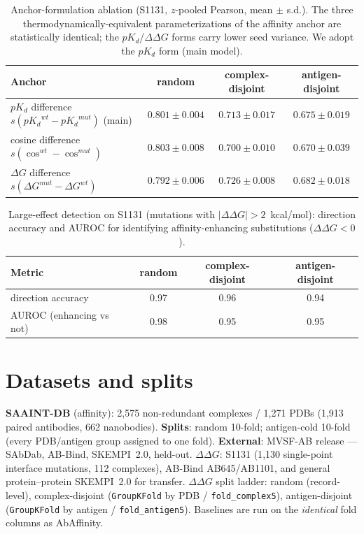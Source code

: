 \documentclass{article}
\newcommand{\ddg}{\ensuremath{\Delta\Delta G}}
\newcommand{\pkd}{\ensuremath{pK_d}}
\begin{document}
\begin{table}[h]\centering
\caption{Anchor-formulation ablation (S1131, $z$-pooled Pearson, mean $\pm$ s.d.). The three
thermodynamically-equivalent parameterizations of the affinity anchor are statistically identical; the
\pkd{}/\ddg{} forms carry lower seed variance. We adopt the \pkd{} form (main model).}
\begin{tabular}{lccc}
\toprule
Anchor & random & complex-disjoint & antigen-disjoint\\
\midrule
\pkd{} difference $s(\pkd^{wt}-\pkd^{mut})$ (main) & $0.801\pm0.004$ & $0.713\pm0.017$ & $0.675\pm0.019$\\
cosine difference $s(\cos^{wt}-\cos^{mut})$        & $0.803\pm0.008$ & $0.700\pm0.010$ & $0.670\pm0.039$\\
$\Delta G$ difference $s(\Delta G^{mut}-\Delta G^{wt})$ & $0.792\pm0.006$ & $0.726\pm0.008$ & $0.682\pm0.018$\\
\bottomrule
\end{tabular}
\end{table}

\begin{table}[h]\centering
\caption{Large-effect detection on S1131 (mutations with $|\ddg|>2$~kcal/mol): direction accuracy and
AUROC for identifying affinity-enhancing substitutions ($\ddg<0$).}
\begin{tabular}{lccc}
\toprule
Metric & random & complex-disjoint & antigen-disjoint\\
\midrule
direction accuracy       & 0.97 & 0.96 & 0.94\\
AUROC (enhancing vs not) & 0.98 & 0.95 & 0.95\\
\bottomrule
\end{tabular}
\end{table}

\section{Datasets and splits}
\textbf{SAAINT-DB} (affinity): 2{,}575 non-redundant complexes / 1{,}271 PDBs (1{,}913 paired antibodies,
662 nanobodies). \textbf{Splits}: random 10-fold; antigen-cold 10-fold (every PDB/antigen group assigned to
one fold). \textbf{External}: MVSF-AB release --- SAbDab, AB-Bind, SKEMPI~2.0, held-out. \textbf{\ddg{}}:
S1131 (1{,}130 single-point interface mutations, 112 complexes), AB-Bind AB645/AB1101, and general
protein--protein SKEMPI~2.0 for transfer. \ddg{} split ladder: random (record-level), complex-disjoint
(\texttt{GroupKFold} by PDB / \texttt{fold\_complex5}), antigen-disjoint (\texttt{GroupKFold} by antigen /
\texttt{fold\_antigen5}). Baselines are run on the \emph{identical} fold columns as AbAffinity.
\end{document}
